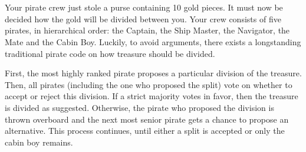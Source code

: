 \documentclass{ape}
\begin{document}
\begin{center}
\end{center}

\begin{solution}

\end{solution}

\section{}
Your pirate crew just stole a purse containing 10 gold pieces. It must now be decided how the gold will be divided between you. Your crew consists of five pirates, in hierarchical order: the Captain, the Ship Master, the Navigator, the Mate and the Cabin Boy. Luckily, to avoid arguments, there exists a longstanding traditional pirate code on how treasure should be divided.

First, the most highly ranked pirate proposes a particular division of the treasure. Then, all pirates (including the one who proposed the split) vote on whether to accept or reject this division. If a strict majority votes in favor, then the treasure is divided as suggested. Otherwise, the pirate who proposed the division is thrown overboard and the next most senior pirate gets a chance to propose an alternative. This process continues, until either a split is accepted or only the cabin boy remains.
\end{document}
